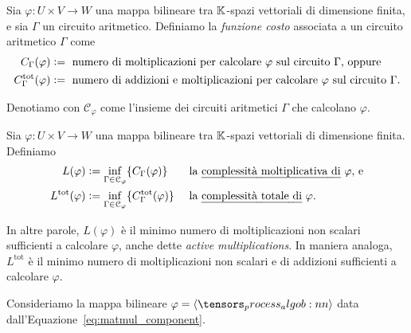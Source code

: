 \begin{definition}
	Sia $ \varphi : U \times V \to W $ una mappa bilineare tra $ \mathbb{K} $-spazi vettoriali di dimensione
	finita, e sia $\Gamma$ un circuito aritmetico. Definiamo la \emph{funzione costo} associata a un circuito aritmetico $ \Gamma $ come
	\begin{equation*}
		\begin{aligned}
			C_{\Gamma}(\varphi)              & \vcentcolon= \text{ numero di moltiplicazioni per calcolare } \varphi
			\text{ sul circuito }\Gamma \text{, oppure}                                                                    \\
			C_{\Gamma}^{\text{tot}}(\varphi) & \vcentcolon= \text{ numero di addizioni e moltiplicazioni per calcolare } \varphi
			\text{ sul circuito }\Gamma.
		\end{aligned}
	\end{equation*}
\end{definition}
Denotiamo con $ \mathcal{C}_{\varphi}$ come l'insieme dei circuiti aritmetici $ \Gamma $ che calcolano $ \varphi $.
\begin{definition}
	\label{def:LtotL}
	Sia $ \varphi : U \times V \to W $ una mappa bilineare tra $ \mathbb{K} $-spazi vettoriali di dimensione finita.
	Definiamo
	\begin{equation*}
		\begin{aligned}
			L(\varphi)              & \vcentcolon= \inf_{\Gamma \in \mathcal{C}_{\varphi}} \{ C_\Gamma(\varphi)\}              &  & \text{ la
			\emph{complessità moltiplicativa di} $ \varphi$, e}                                                                         \\
			L^{\text{tot}}(\varphi) & \vcentcolon= \inf_{\Gamma \in \mathcal{C}_{\varphi}} \{ C_\Gamma^{\text{tot}}(\varphi)\} &  & \text{ la
				\emph{complessità totale di} $ \varphi $.}
		\end{aligned}
	\end{equation*}
\end{definition}
\begin{remark}
	In altre parole, $ L(\varphi) $ è il minimo numero di moltiplicazioni non scalari
	sufficienti a calcolare $ \varphi $, anche dette \emph{active multiplications}. In maniera analoga, $ L^{\text{tot}} $ è il minimo numero di
	moltiplicazioni non scalari e di addizioni sufficienti a calcolare $
		\varphi $.
\end{remark}
Consideriamo la mappa bilineare $ \varphi = \algob{n} $ data
dall'Equazione~\eqref{eq:matmul_component}.
